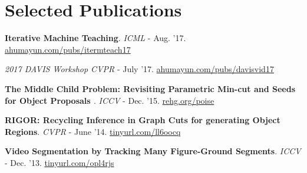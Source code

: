 \documentclass[10pt,twoside,a4paper]{article}
\newif\ifdetail
\begin{document}
\section{\ifdetail \else Selected \fi Publications}
{
\small
\textbf{Iterative Machine Teaching}. \ifdetail ($3^{\text{rd}}$ author) \newline \fi
\textit{\ifdetail International Conference on Machine Learning (ICML) \else ICML \fi} - Aug. '17.
\href{http://ahumayun.com/pubs/liu_ICML_2017_itermteach.pdf}{ahumayun.com/pubs/itermteach17} %

\ifdetail
\textbf{Multiple-Instance Video Segmentation with Sequence-Specific Object Proposals}. \ifdetail ($3^{\text{rd}}$ author) \newline \fi
\textit{\ifdetail The 2017 DAVIS Challenge on Video Object Segmentation - CVPR Workshops \else 2017 DAVIS Workshop CVPR \fi} - July '17.
\href{http://ahumayun.com/pubs/shaban_CVPRDavis_2017_vidsegobjprop.pdf}{ahumayun.com/pubs/davisvid17} %
\fi

\textbf{The Middle Child Problem: \ifdetail\else{\scriptsize\fi Revisiting Parametric Min-cut and Seeds for Object Proposals \ifdetail\else}\fi}. \ifdetail ($1^{\text{st}}$ author) \newline \fi
\textit{\ifdetail International Conference on Computer Vision (ICCV) \else ICCV \fi} - Dec. '15. 
\href{http://rehg.org/poise}{rehg.org/poise} %

\ifdetail
\textbf{Finding Temporally Consistent Occlusion Boundaries in Videos using Geometric Context}. ($2^{\text{nd}}$ author) \newline \textit{IEEE Winter Conference on Applications of Computer Vision (WACV)} - Jan. '15. \href{http://cpl.cc.gatech.edu/projects/temporaloccl/}{cpl.cc.gatech.edu/projects/temporaloccl/} %
\fi

\textbf{RIGOR: Recycling Inference in Graph Cuts for generating Object Regions}. \ifdetail ($1^{\text{st}}$ author) \newline \fi \textit{\ifdetail IEEE Conference on Computer Vision and Pattern Recognition (CVPR) \else CVPR \fi} - June '14. \href{http://cpl.cc.gatech.edu/projects/RIGOR/}{\ifdetail cpl.cc.gatech.edu/projects/RIGOR/ \else tinyurl.com/ll6oocq \fi}

\textbf{Video Segmentation by Tracking Many Figure-Ground Segments}. \ifdetail ($3^{\text{rd}}$ author) \newline \fi \textit{\ifdetail International Conference on Computer Vision (ICCV) \else ICCV \fi} - Dec. '13. \href{http://www.cc.gatech.edu/~fli/SegTrack2/}{\ifdetail cc.gatech.edu/$\sim$fli/SegTrack2/ \else tinyurl.com/opl4rjs \fi}

}
\end{document}
